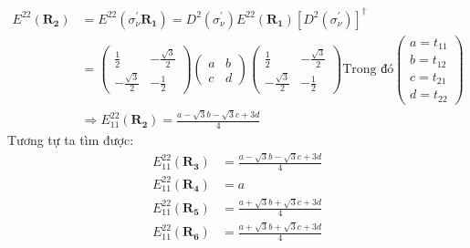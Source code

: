 \documentclass{article}
\begin{document}
\begin{align*}
	E^{22} (\mathbf{R_2}) & = E^{22}(\sigma_\nu^{'} \mathbf{R_1}) = D^2(\sigma^{'}_\nu) E^{22} (\mathbf{R_1}) [D^2(\sigma_\nu ^{'})]^\dagger \\
	                      & =
	\begin{pmatrix}
		\frac{1}{2}         & -\frac{\sqrt{3}}{2} \\
		-\frac{\sqrt{3}}{2} & -\frac{1}{2}
	\end{pmatrix} \begin{pmatrix}
		              a & b \\
		              c & d
	              \end{pmatrix}\begin{pmatrix}
		                           \frac{1}{2}         & -\frac{\sqrt{3}}{2} \\
		                           -\frac{\sqrt{3}}{2} & -\frac{1}{2}
	                           \end{pmatrix}\text{Trong đó}\begin{pmatrix}
		                                                       a = t_{11} \\
		                                                       b = t_{12} \\
		                                                       c = t_{21} \\
		                                                       d = t_{22}
	                                                       \end{pmatrix}                                                      \\
	                      & \Rightarrow E^{22}_{11} (\mathbf{R_2}) = \frac{a - \sqrt{3}b - \sqrt{3}c + 3d}{4}
\end{align*}
Tương tự ta tìm được:
\begin{align*}
	E^{22}_{11} (\mathbf{R_3}) & = \frac{a - \sqrt{3}b - \sqrt{3}c + 3d}{4} \\
	E^{22}_{11} (\mathbf{R_4}) & = a                                        \\
	E^{22}_{11} (\mathbf{R_5}) & = \frac{a + \sqrt{3}b + \sqrt{3}c + 3d}{4} \\
	E^{22}_{11} (\mathbf{R_6}) & = \frac{a + \sqrt{3}b + \sqrt{3}c + 3d}{4} \\
\end{align*}
\end{document}
